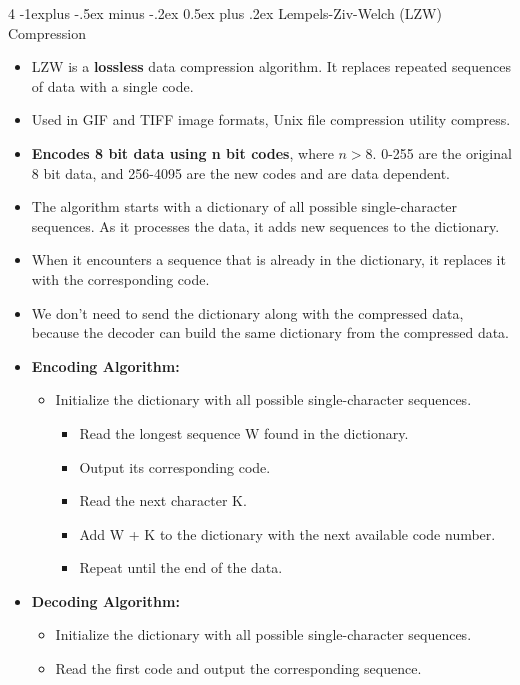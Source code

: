 \documentclass[10pt, landscape]{article}
\makeatletter
\renewcommand{\subsection}{\@startsection{subsection}{2}{0mm}%
  {-1explus -.5ex minus -.2ex}%
  {0.5ex plus .2ex}%
{\normalfont\normalsize\bfseries}}
\makeatother
\begin{document}
\begin{multicols*}{4}
    \subsection{Lempels-Ziv-Welch (LZW) Compression}
    \begin{itemize}
      \item LZW is a \textbf{lossless} data compression algorithm. It replaces repeated sequences of data with a single code.
      \item Used in GIF and TIFF image formats, Unix file compression utility compress.
      \item \textbf{Encodes 8 bit data using n bit codes}, where $n > 8$. 0-255 are the original 8 bit data, and 256-4095 are the new codes and are data dependent.
      \item The algorithm starts with a dictionary of all possible single-character sequences. As it processes the data, it adds new sequences to the dictionary.
      \item When it encounters a sequence that is already in the dictionary, it replaces it with the corresponding code.
      \item We don't need to send the dictionary along with the compressed data, because the decoder can build the same dictionary from the compressed data.
      \item \textbf{Encoding Algorithm:}
      \begin{itemize}
        \item Initialize the dictionary with all possible single-character sequences.
        \begin{itemize}
          \item Read the longest sequence W found in the dictionary.
          \item Output its corresponding code.
          \item Read the next character K.
          \item Add W + K to the dictionary with the next available code number.
          \item Repeat until the end of the data.
        \end{itemize}
      \end{itemize}
      \item \textbf{Decoding Algorithm:}
      \begin{itemize}
        \item Initialize the dictionary with all possible single-character sequences.
        \item Read the first code and output the corresponding sequence.

\end{itemize}
\end{itemize}
\end{multicols*}
\end{document}
